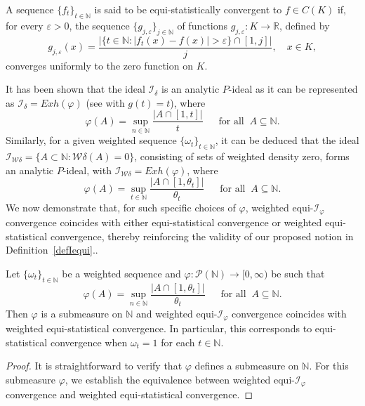 \documentclass[reqno]{amsart}
\begin{document}
{\begin{definition}
A sequence $\{f_t\}_{t \in \mathbb{N}}$ is said to be equi-statistically convergent to $f \in C(K)$ if, for every $\varepsilon > 0$, the sequence $\{g_{j,\varepsilon}\}_{j \in \mathbb{N}}$ of functions $g_{j,\varepsilon} : K \to \mathbb{R}$, defined by
\begin{equation*}
g_{j,\varepsilon}(x) = \frac{|\{t \in \mathbb{N} : |f_t(x) - f(x)| > \varepsilon\} \cap [1,j]|}{j}, \quad x \in K,
\end{equation*}
converges uniformly to the zero function on $K$.
\end{definition}

It has been shown that the ideal $\mathcal{I}_{\delta}$ is an analytic $P$-ideal as it can be represented as $\mathcal{I}_{\delta}=Exh (\varphi)$ (see \cite[Proposition 1.1]{balcerzak2015generalized} with $g(t)=t$), where
$$
\varphi(A)=\sup_{n\in\mathbb{N}}\frac{|A\cap[1,t]|}{t}~\quad \mbox{ for all }~A\subseteq \mathbb{N}.
$$
Similarly, for a given weighted sequence $\{\omega_t\}_{t\in\mathbb{N}}$, it can be deduced that the ideal $\mathcal{I}_{\mathcal{W}\delta} = \{A \subset \mathbb{N} : \mathcal{W}\delta(A) = 0\}$, consisting of sets of weighted density zero, forms an analytic $P$-ideal, with $\mathcal{I}_{\mathcal{W}\delta} = Exh(\varphi)$, where
$$
\varphi(A)=\sup_{t\in\mathbb{N}}\frac{|A\cap[1,\theta_t]|}{\theta_t}~\quad \mbox{ for all }~A\subseteq \mathbb{N}.
$$
We now demonstrate that, for such specific choices of $\varphi$, weighted equi-$\mathcal{I}_{\varphi}$ convergence coincides with either equi-statistical convergence or weighted equi-statistical convergence, thereby reinforcing the validity of our proposed notion in Definition~\ref{defIequi}..
\begin{proposition}\label{procoincidence}
Let $\{\omega_t\}_{t\in\mathbb{N}}$ be a weighted sequence and $\varphi:\mathcal{P}(\mathbb{N})\to [0,\infty)$ be such that 
$$
\varphi(A)=\sup_{n\in\mathbb{N}}\frac{|A\cap[1,\theta_t]|}{\theta_t}~\quad \mbox{ for all }~A\subseteq \mathbb{N}.
$$
Then $\varphi$ is a submeasure on $\mathbb{N}$ and weighted equi-$\mathcal{I}_{\varphi}$ convergence coincides with weighted equi-statistical convergence. In particular,  this corresponds to equi-statistical convergence when $\omega_t=1$ for each $t\in\mathbb{N}$.
\end{proposition}
\begin{proof}
	It is straightforward to verify that $\varphi$ defines a submeasure on $\mathbb{N}$. For this submeasure $\varphi$, we establish the equivalence between weighted equi-$\mathcal{I}_{\varphi}$ convergence and weighted equi-statistical convergence. 

\end{proof}}
\end{document}
